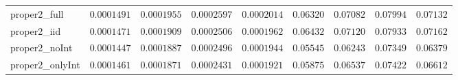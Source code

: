 \begin{table}
\begin{tabular}{lcccccccc}
proper2_full  & $0.0001491$ & $0.0001955$ & $0.0002597$ & $0.0002014$ & $0.06320$ & $0.07082$ & $0.07994$ & $0.07132$ \\
proper2_iid  & $0.0001471$ & $0.0001909$ & $0.0002506$ & $0.0001962$ & $0.06432$ & $0.07120$ & $0.07933$ & $0.07162$ \\
proper2_noInt  & $0.0001447$ & $0.0001887$ & $0.0002496$ & $0.0001944$ & $0.05545$ & $0.06243$ & $0.07349$ & $0.06379$ \\
proper2_onlyInt  & $0.0001461$ & $0.0001871$ & $0.0002431$ & $0.0001921$ & $0.05875$ & $0.06537$ & $0.07422$ & $0.06612$ \\
\hline 
\end{tabular}


\end{table}